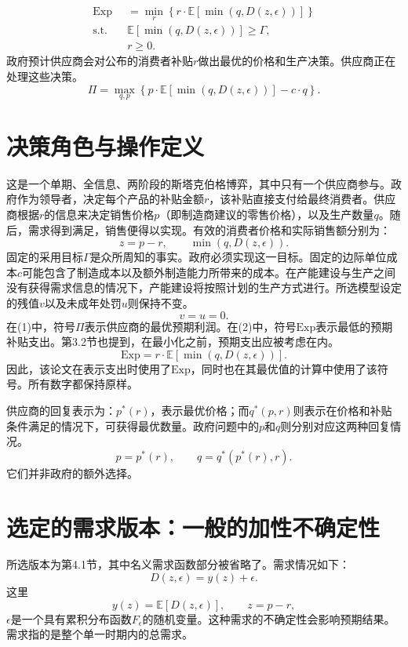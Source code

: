 \documentclass{article}
\begin{document}
\begin{equation}
\begin{aligned}
\mathrm{Exp}
&=\min_r\left\{r\cdot\mathbb{E}\left[\min(q,D(z,\epsilon))\right]\right\}\\
\text{s.t.}\quad
&\mathbb{E}\left[\min(q,D(z,\epsilon))\right]\geq\Gamma,\\
&r\geq 0.
\end{aligned}
\tag{2}
\end{equation}
政府预计供应商会对公布的消费者补贴$r$做出最优的价格和生产决策。供应商正在处理这些决策。
\begin{equation}
\Pi=\max_{q,p}\left\{p\cdot\mathbb{E}\left[\min(q,D(z,\epsilon))\right]-c\cdot q\right\}.
\tag{1}
\end{equation}

\section*{决策角色与操作定义}
这是一个单期、全信息、两阶段的斯塔克伯格博弈，其中只有一个供应商参与。政府作为领导者，决定每个产品的补贴金额$r$，该补贴直接支付给最终消费者。供应商根据$r$的信息来决定销售价格$p$（即制造商建议的零售价格），以及生产数量$q$。随后，需求得到满足，销售便得以实现。有效的消费者价格和实际销售额分别为：
\[
z=p-r,
\qquad
\min(q,D(z,\epsilon)).
\]
固定的采用目标$\Gamma$是众所周知的事实。政府必须实现这一目标。固定的边际单位成本$c$可能包含了制造成本以及额外制造能力所带来的成本。在产能建设与生产之间没有获得需求信息的情况下，产能建设将按照计划的生产方式进行。所选模型设定的残值$v$以及未成年处罚$u$则保持不变。
\[
v=u=0.
\]
在(1)中，符号$\Pi$表示供应商的最优预期利润。在(2)中，符号$\mathrm{Exp}$表示最低的预期补贴支出。第3.2节也提到，在最小化之前，预期支出应被考虑在内。
\begin{equation}
\mathrm{Exp}=r\cdot\mathbb{E}\left[\min(q,D(z,\epsilon))\right].
\tag{5}
\end{equation}
因此，该论文在表示支出时使用了$\mathrm{Exp}$，同时也在其最优值的计算中使用了该符号。所有数字都保持原样。

供应商的回复表示为：$p^*(r)$，表示最优价格；而$q^*(p,r)$则表示在价格和补贴条件满足的情况下，可获得最优数量。政府问题中的$p$和$q$则分别对应这两种回复情况。
\[
p=p^*(r),
\qquad
q=q^*(p^*(r),r).
\]
它们并非政府的额外选择。

\section*{选定的需求版本：一般的加性不确定性}
所选版本为第4.1节，其中名义需求函数部分被省略了。需求情况如下：
\begin{equation}
D(z,\epsilon)=y(z)+\epsilon.
\tag{8}
\end{equation}
这里
\[
y(z)=\mathbb{E}[D(z,\epsilon)],
\qquad z=p-r,
\]
$\epsilon$是一个具有累积分布函数$F_\epsilon$的随机变量。这种需求的不确定性会影响预期结果。需求指的是整个单一时期内的总需求。
\end{document}
